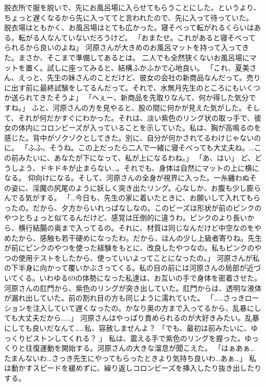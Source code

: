脱衣所で服を脱いで、先にお風呂場に入らせてもらうことにした。というより、ちょっと遅くなるから先に入っててと言われたので、先に入って待っていた。
脱衣場はともかく、お風呂場はとても広かった。寝そべって転がれるくらいはある。転がる人なんていないだろうけど。
「おまたせ。これがあると寝そべってられるから良いのよね」
河原さんが大きめのお風呂マットを持って入ってきた。まさか、そこまで準備してあるとは。
二人でも全然狭くないお風呂場にマットを置く。試しに座ってみると、結構ふかふかで心地良い。
「これ、夏美さん、えっと、先生の妹さんのことだけど、彼女の会社の新商品なんだって。売りに出す前に最終試験をしてるんだって。それで、水無月先生のところにもいくつか送られてきたそうよ」
「へぇー、新商品を先取りなんて、何か得した気分ですね。」
ふと、河原さんの方を見やると、股の間に何かが見えた気がした。そして、それが何だかすぐにわかった。それは、淡い紫色のリング状の取っ手で、彼女の体内にコロンビーズが入っていることを示していた。私は、胸が高鳴るのを感じた。背中がゾクゾクとしてきた。別に、自分が何かされてるわけじゃないのに。
「ふふ、そうね。この上だったら二人で一緒に寝そべっても大丈夫ね。…この前みたいに、あなたが下になって、私が上になるわね。」
「あ、はい」
ど、どうしよう、ドキドキが止まらない…。それでも、身体は自然にマットの上に横になる。
仰向けになる。そして、河原さんの全身が視界に入った。一糸纏わぬその姿に、淫魔の尻尾のように妖しく突き出たリング。心なしか、お腹も少し膨らんでる気がする。
「…今日も、先生の家に着いたときに、お願いして入れてもらったの。だから、夕方からいれっぱなしなの。このビーズは形状が前のピンクのやつとちょっと似てるんだけど、感覚は圧倒的に違うわ。ピンクのより長いから、横行結腸の奥まで入ってるの。それに、材質は同じなんだけど中空なのをやめたから、感触も若干硬めになったわ。だから、ほんの少し上級者寄りね。先生が前にピンクのやつを使った経験をもとに、改良したやつなの。私もピンクのやつの使用テストをしたから、使っていいよってことになったの。」
河原さんが私の下半身に向かって覆いかぶさってくる。私の目の前には河原さんの局部が近づいてくる。いわゆる69の体勢になった私達は、お互いの手で身体を密着させた。
河原さんの肛門から、紫色のリングが突き出していた。肛門からは、透明な液体が漏れ出していた。前の割れ目の方も同じように濡れていた。
「……さっきローションを注入していて遅くなったの。かなり奥の方まで入ってるから、乱暴にしても大丈夫だから……」
河原さんはやっぱり責められるのが大好きみたい。乱暴にしても良いだなんて……私、容赦しませんよ？
「でも、最初は前みたいに、ゆっくりピストンしてくれる？ 」
私は、震える手で紫色のリングを握った。ゆっくりと往復運動を開始する。河原さんの大きな溜息が聞こえた。
「はぁあぁ…たまんないわ…さっき先生にやってもらったときより気持ち良いわ…あぁ…」
私は動かすスピードを緩めずに、繰り返しコロンビーズを挿入したり抜き出したりする。
